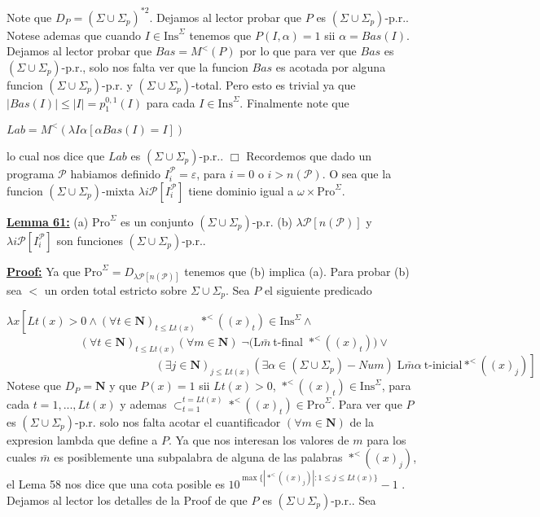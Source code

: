 Note que \(D_{P}=(\Sigma \cup \Sigma _{p})^{\ast 2}\). Dejamos al lector probar que \(P\) es \((\Sigma \cup \Sigma _{p})\)-p.r.. Notese ademas que cuando \(I\in \mathrm{Ins}^{\Sigma }\) tenemos que \(P(I,\alpha )=1\) sii \(\alpha =Bas(I)\). Dejamos al lector probar que \(Bas=M^{< }\left( P\right) \) por lo que para ver que \(Bas\) es \((\Sigma \cup \Sigma _{p})\)-p.r., solo nos falta ver que la funcion \(Bas\) es acotada por alguna funcion \((\Sigma \cup \Sigma _{p})\)-p.r. y \((\Sigma \cup \Sigma _{p})\)-total. Pero esto es trivial ya que \(\left\vert Bas(I)\right\vert \leq \left\vert I\right\vert =p_{1}^{0,1}(I)\) para cada \(I\in \mathrm{Ins}^{\Sigma }\).
Finalmente note que

\(\displaystyle Lab=M^{< }\left( \lambda I\alpha \left[ \alpha Bas(I)=I\right] \right) \)

lo cual nos dice que \(Lab\) es \((\Sigma \cup \Sigma _{p})\)-p.r.. \(\Box\)
Recordemos que dado un programa \(\mathcal{P}\) habiamos definido \(I_{i}^{ \mathcal{P}}=\varepsilon \), para \(i=0\) o \(i >n(\mathcal{P}).\) O sea que la funcion \((\Sigma \cup \Sigma _{p})\)-mixta \(\lambda i\mathcal{P}\left[ I_{i}^{ \mathcal{P}}\right] \) tiene dominio igual a \(\omega \times \mathrm{Pro} ^{\Sigma }\).

\textbf{\underline{Lemma 61:}}
(a) \(\mathrm{Pro}^{\Sigma }\) es un conjunto \((\Sigma \cup \Sigma _{p}) \)-p.r.
(b) \(\lambda \mathcal{P}\left[ n(\mathcal{P})\right] \) y \(\lambda i \mathcal{P}\left[ I_{i}^{\mathcal{P}}\right] \) son funciones \((\Sigma \cup \Sigma _{p})\)-p.r..

\textbf{\underline{Proof:}} Ya que \(\mathrm{Pro}^{\Sigma }=D_{\lambda \mathcal{P}\left[ n(\mathcal{P}) \right] }\) tenemos que (b) implica (a). Para probar (b) sea \(< \) un orden total estricto sobre \(\Sigma \cup \Sigma _{p}\). Sea \(P\) el siguiente predicado

\(\lambda x\left[ Lt(x) >0\wedge (\forall t\in \mathbf{N})_{t\leq Lt(x)}\;\ast ^{< }((x)_{t})\in \mathrm{Ins}^{\Sigma }\wedge \right. \)
\(\ \ \ \ \ \ \ \ \ \ \ \ \ \ \ \ \ \ \ \ \ \ \ \ \ \ \ \ \ (\forall t\in \mathbf{N})_{t\leq Lt(x)}(\forall m\in \mathbf{N})\;\lnot (\mathrm{L} \bar{m}\ \)t-final \(\ast ^{< }((x)_{t}))\vee \)
\(\ \ \ \ \ \ \ \ \ \ \ \ \ \ \ \ \ \ \ \ \ \ \ \ \ \ \ \ \ \ \ \ \ \ \ \ \ \ \ \ \ \ \ \ \ \ \ \ \ \ \ \ \ \ \ \ \ \ \ \left. (\exists j\in \mathbf{ N})_{j\leq Lt(x)}(\exists \alpha \in (\Sigma \cup \Sigma _{p})-Num)\;\mathrm{ L}\bar{m}\alpha \ \text{t-inicial}\ast ^{< }((x)_{j})\right] \)
Notese que \(D_{P}=\mathbf{N}\) y que \(P(x)=1\) sii \(Lt(x) >0\), \(\ast ^{< }((x)_{t})\in \mathrm{Ins}^{\Sigma }\), para cada \(t=1,...,Lt(x)\) y ademas \(\subset _{t=1}^{t=Lt(x)}\ast ^{< }((x)_{t})\in \mathrm{Pro}^{\Sigma }\). Para ver que \(P\) es \((\Sigma \cup \Sigma _{p})\)-p.r. solo nos falta acotar el cuantificador \((\forall m\in \mathbf{N})\) de la expresion lambda que define a \(P\). Ya que nos interesan los valores de \(m\) para los cuales \(\bar{m}\) es posiblemente una subpalabra de alguna de las palabras \(\ast ^{< }((x)_{j})\), el Lema 58 nos dice que una cota posible es \( 10^{\max \{\left\vert \ast ^{< }((x)_{j})\right\vert :1\leq j\leq Lt(x)\}}-1\) . Dejamos al lector los detalles de la Proof de que \(P\) es \((\Sigma \cup \Sigma _{p})\)-p.r.. Sea

